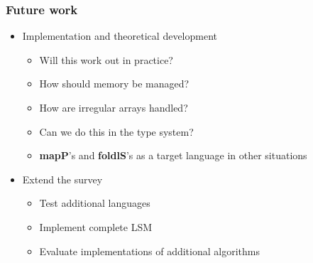 \documentclass{beamer}
\begin{document}
\begin{frame}
  \frametitle{Future work}
  \begin{itemize}
  \item<1-> Implementation and theoretical development
    \begin{itemize}
    \item Will this work out in practice?
    \item How should memory be managed?
    \item How are irregular arrays handled?
    \item Can we do this in the type system?
    \item \textbf{mapP}'s and \textbf{foldlS}'s as a target language in other
      situations
    \end{itemize}
  \item<2-> Extend the survey
    \begin{itemize}
    \item Test additional languages
    \item Implement complete LSM
    \item Evaluate implementations of additional algorithms
     \end{itemize}
  \end{itemize}
\end{frame}
\end{document}
